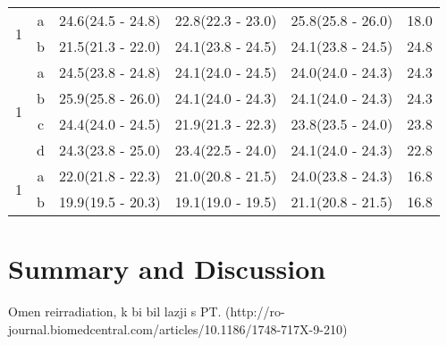 \documentclass[type=dr, dr=rernat, accentcolor=tud7b,colorbacktitle, bigchapter, openright, twoside, 12pt ]{tudthesis}
\begin{document}
\begin{table}[H]
\begin{tabular}{c|c|c|c|c|c}
\multirow{2}{*}{1} & a & 24.6(24.5 - 24.8) & 22.8(22.3 - 23.0) & 25.8(25.8 - 26.0) & 18.0\\ 
 & b & 21.5(21.3 - 22.0) & 24.1(23.8 - 24.5) & 24.1(23.8 - 24.5) & 24.8\\ 
\hline

\multirow{4}{*}{1} & a & 24.5(23.8 - 24.8) & 24.1(24.0 - 24.5) & 24.0(24.0 - 24.3) & 24.3\\ 
 & b & 25.9(25.8 - 26.0) & 24.1(24.0 - 24.3) & 24.1(24.0 - 24.3) & 24.3\\ 
 & c & 24.4(24.0 - 24.5) & 21.9(21.3 - 22.3) & 23.8(23.5 - 24.0) & 23.8\\ 
 & d & 24.3(23.8 - 25.0) & 23.4(22.5 - 24.0) & 24.1(24.0 - 24.3) & 22.8\\ 
\hline

\multirow{2}{*}{1} & a & 22.0(21.8 - 22.3) & 21.0(20.8 - 21.5) & 24.0(23.8 - 24.3) & 16.8\\ 
 & b & 19.9(19.5 - 20.3) & 19.1(19.0 - 19.5) & 21.1(20.8 - 21.5) & 16.8\\ 
\hline


		\hline\hline
		
	\end{tabular}
	\label{tab:resultsComplex}
\end{table}


\section{Summary and Discussion}

Omen reirradiation, k bi bil lazji s PT. (http://ro-journal.biomedcentral.com/articles/10.1186/1748-717X-9-210)




{}
% 
\end{document}

